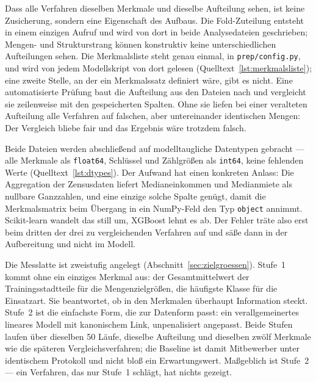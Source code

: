 Dass alle Verfahren dieselben Merkmale und dieselbe Aufteilung sehen, ist keine
Zusicherung, sondern eine Eigenschaft des Aufbaus. Die Fold-Zuteilung entsteht
in einem einzigen Aufruf und wird von dort in beide Analysedateien geschrieben;
Mengen- und Strukturstrang können konstruktiv keine unterschiedlichen
Aufteilungen sehen. Die Merkmalsliste steht genau einmal, in
\texttt{prep/config.py}, und wird von jedem Modellskript von dort gelesen
(Quelltext~\ref{lst:merkmalsliste}); eine zweite Stelle, an der ein
Merkmalssatz definiert wäre, gibt es nicht. Eine automatisierte Prüfung baut
die Aufteilung aus den Dateien nach und vergleicht sie zeilenweise mit den
gespeicherten Spalten. Ohne sie liefen bei einer veralteten Aufteilung alle
Verfahren auf falschen, aber untereinander identischen Mengen: Der Vergleich
bliebe fair und das Ergebnis wäre trotzdem falsch.

Beide Dateien werden abschließend auf modelltaugliche Datentypen gebracht ---
alle Merkmale als \texttt{float64}, Schlüssel und Zählgrößen als
\texttt{int64}, keine fehlenden Werte (Quelltext~\ref{lst:dtypes}). Der Aufwand
hat einen konkreten Anlass: Die Aggregation der Zensusdaten liefert
Medianeinkommen und Medianmiete als nullbare Ganzzahlen, und eine einzige
solche Spalte genügt, damit die Merkmalsmatrix beim Übergang in ein
NumPy-Feld den Typ \texttt{object} annimmt. Scikit-learn wandelt das still um,
XGBoost lehnt es ab. Der Fehler träte also erst beim dritten der drei zu
vergleichenden Verfahren auf und säße dann in der Aufbereitung und nicht im
Modell.

Die Messlatte ist zweistufig angelegt (Abschnitt~\ref{sec:zielgroessen}).
Stufe~1 kommt ohne ein einziges Merkmal aus: der Gesamtmittelwert der
Trainingsstadtteile für die Mengenzielgrößen, die häufigste Klasse für die
Einsatzart. Sie beantwortet, ob in den Merkmalen überhaupt Information steckt.
Stufe~2 ist die einfachste Form, die zur Datenform passt: ein verallgemeinertes
lineares Modell mit kanonischem Link, unpenalisiert angepasst. Beide Stufen
laufen über dieselben 50 Läufe, dieselbe Aufteilung und dieselben zwölf
Merkmale wie die späteren Vergleichsverfahren; die Baseline ist damit
Mitbewerber unter identischem Protokoll und nicht bloß ein Erwartungswert.
Maßgeblich ist Stufe~2 --- ein Verfahren, das nur Stufe~1 schlägt, hat nichts
gezeigt.

